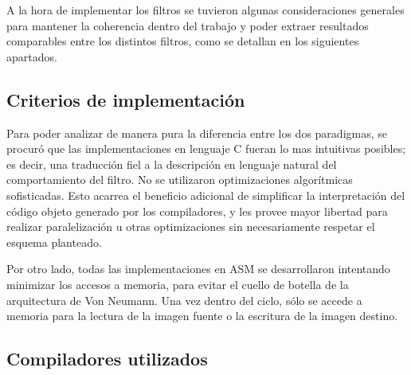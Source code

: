 
A la hora de implementar los filtros se tuvieron algunas consideraciones generales para mantener la coherencia dentro del trabajo y poder extraer resultados comparables entre los distintos filtros, como se detallan en los siguientes apartados.

\subsection{Criterios de implementación}

Para poder analizar de manera pura la diferencia entre los dos paradigmas, se procuró que las implementaciones en lenguaje C fueran lo mas intuitivas posibles; es decir, una traducción fiel a la descripción en lenguaje natural del comportamiento del filtro. No se utilizaron optimizaciones algorítmicas sofisticadas. Esto acarrea el beneficio adicional de simplificar la interpretación del código objeto generado por los compiladores, y les provee mayor libertad para realizar paralelización u otras optimizaciones sin necesariamente respetar el esquema planteado.

Por otro lado, todas las implementaciones en ASM se desarrollaron intentando minimizar los accesos a memoria, para evitar el cuello de botella de la arquitectura de Von Neumann. Una vez dentro del ciclo, sólo se accede a memoria para la lectura de la imagen fuente o la escritura de la imagen destino.


\subsection{Compiladores utilizados}
			
